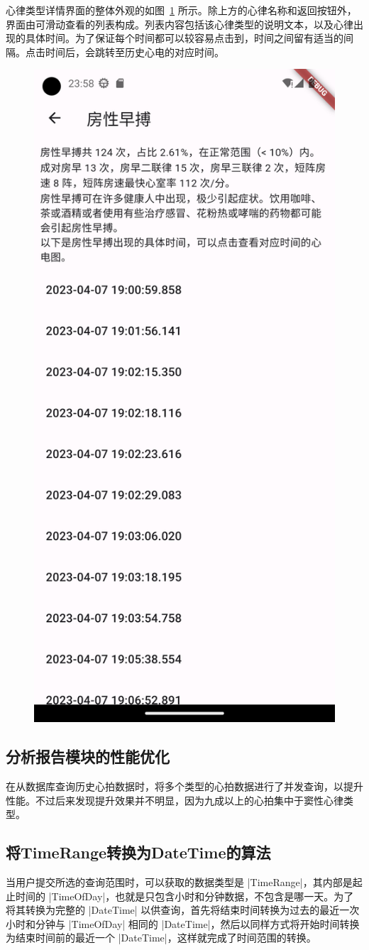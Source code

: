 心律类型详情界面的整体外观的如图~\ref{fig:label-details} 所示。除上方的心律名称和返回按钮外，界面由可滑动查看的列表构成。列表内容包括该心律类型的说明文本，以及心律出现的具体时间。为了保证每个时间都可以较容易点击到，时间之间留有适当的间隔。点击时间后，会跳转至历史心电的对应时间。

\begin{figure}[ht]
    \centering
    \includegraphics[width=.33\textwidth]{../assets/label-details}
    \label{fig:label-details}
\end{figure}

\subsection{分析报告模块的性能优化}\label{subsec:analytics-performance}

在从数据库查询历史心拍数据时，将多个类型的心拍数据进行了并发查询，以提升性能。不过后来发现提升效果并不明显，因为九成以上的心拍集中于窦性心律类型。

\subsection{将TimeRange转换为DateTime的算法}\label{subsec:timerange-to-datetime}

当用户提交所选的查询范围时，可以获取的数据类型是 |TimeRange|，其内部是起止时间的 |TimeOfDay|，也就是只包含小时和分钟数据，不包含是哪一天。为了将其转换为完整的 |DateTime| 以供查询，首先将结束时间转换为过去的最近一次小时和分钟与 |TimeOfDay| 相同的 |DateTime|，然后以同样方式将开始时间转换为结束时间前的最近一个 |DateTime|，这样就完成了时间范围的转换。

